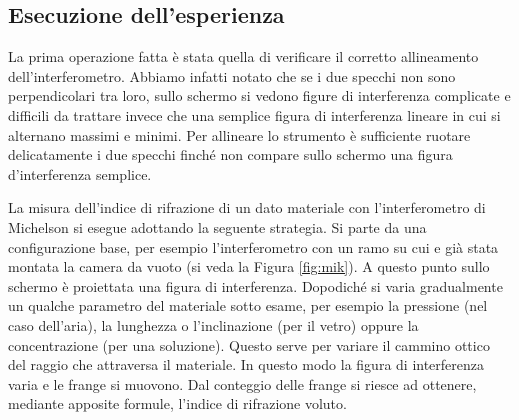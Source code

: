 \subsection{Esecuzione dell'esperienza}

La prima operazione fatta è stata quella di verificare il corretto allineamento dell'interferometro. Abbiamo infatti notato che se i due specchi non sono perpendicolari tra loro, sullo schermo si vedono figure di interferenza complicate e difficili da trattare invece che una semplice figura di interferenza lineare in cui si alternano massimi e minimi. Per allineare lo strumento è sufficiente ruotare delicatamente i due specchi finché non compare sullo schermo una figura d'interferenza semplice.


La misura dell'indice di rifrazione di un dato materiale con l'interferometro di Michelson si esegue adottando la seguente strategia.
Si parte da una configurazione base, per esempio l'interferometro con un ramo su cui e già stata montata la camera da vuoto
(si veda la Figura \ref{fig:mik}). A questo punto sullo schermo è proiettata una figura di interferenza. Dopodiché si
varia gradualmente un qualche parametro del materiale sotto esame, per esempio la pressione (nel caso dell'aria), la lunghezza o l'inclinazione (per il vetro) oppure la concentrazione (per una soluzione). %
Questo serve per variare il cammino ottico del raggio che attraversa il materiale.
In questo modo la figura di interferenza varia e le frange si muovono. Dal conteggio delle frange si riesce ad ottenere, mediante
apposite formule, l'indice di rifrazione voluto.


%

